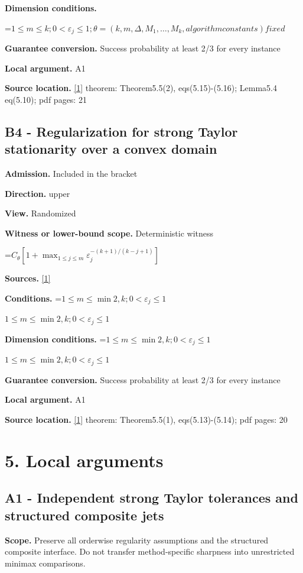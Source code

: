 \documentclass[10pt,a4paper]{article}
\newcommand{\AtlasMath}[1]{\par\begingroup\centering\setbox0=\hbox{$\displaystyle #1$}\ifdim\wd0>1.4\linewidth\typeout{ATLAS WIDE FORMULA: \the\wd0}\fi\ifdim\wd0>\linewidth\resizebox{\linewidth}{!}{\box0}\else\box0\fi\par\endgroup}
\newcommand{\AtlasInlineMath}[1]{\begingroup\setbox0=\hbox{$#1$}\ifdim\wd0>.4\linewidth\endgroup\AtlasMath{#1}\else\endgroup$#1$\fi}
\begin{document}
\textbf{Dimension conditions.} 
\AtlasMath{1\le m\le k;0<\varepsilon_j\le 1;\theta=(k,m,\Delta,M_1,\ldots,M_k,algorithm constants) fixed}


\textbf{Guarantee conversion.} Success probability at least 2/3 for every instance

\textbf{Local argument.} A1

\textbf{Source location.} \href{https://optimization-online.org/wp-content/uploads/2020/01/7590.pdf}{[1]} theorem: Theorem5.5(2), eqs(5.15)-(5.16); Lemma5.4 eq(5.10); pdf pages: 21

\subsection{B4 - Regularization for strong Taylor stationarity over a convex domain}
\textbf{Admission.} Included in the bracket

\textbf{Direction.} upper

\textbf{View.} Randomized

\textbf{Witness or lower-bound scope.} Deterministic witness

\AtlasMath{C_\theta[1+\max_{1\le j\le m}\varepsilon_j^{-(k+1)/(k-j+1)}]}
\textbf{Sources.} \href{https://optimization-online.org/wp-content/uploads/2020/01/7590.pdf}{[1]}

\textbf{Conditions.} \AtlasInlineMath{1\le m\le \min{2,k};0<\varepsilon_j\le 1}

\textbf{Dimension conditions.} \AtlasInlineMath{1\le m\le \min{2,k};0<\varepsilon_j\le 1}

\textbf{Guarantee conversion.} Success probability at least 2/3 for every instance

\textbf{Local argument.} A1

\textbf{Source location.} \href{https://optimization-online.org/wp-content/uploads/2020/01/7590.pdf}{[1]} theorem: Theorem5.5(1), eqs(5.13)-(5.14); pdf pages: 20

\section{5. Local arguments}
\subsection{A1 - Independent strong Taylor tolerances and structured composite jets}
\textbf{Scope.} Preserve all orderwise regularity assumptions and the structured composite interface. Do not transfer method-specific sharpness into unrestricted minimax comparisons.
\end{document}
